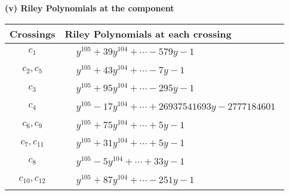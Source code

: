 \documentclass[1p]{elsarticle_modified}
\theoremstyle{definition}
\begin{document}
\newpage\renewcommand{\arraystretch}{1}
\flushleft \textbf{(v) Riley Polynomials at the component}\newline \\
\begin{tabular}{m{50pt}|m{274pt}}
Crossings & \hspace{64pt}Riley Polynomials at each crossing \\
\hline $$\begin{aligned}c_{1}\end{aligned}$$&$\begin{aligned}
&y^{105}+39 y^{104}+\cdots-579 y-1
\end{aligned}$\\
\hline $$\begin{aligned}c_{2},c_{5}\end{aligned}$$&$\begin{aligned}
&y^{105}+43 y^{104}+\cdots-7 y-1
\end{aligned}$\\
\hline $$\begin{aligned}c_{3}\end{aligned}$$&$\begin{aligned}
&y^{105}+95 y^{104}+\cdots-295 y-1
\end{aligned}$\\
\hline $$\begin{aligned}c_{4}\end{aligned}$$&$\begin{aligned}
&y^{105}-17 y^{104}+\cdots+26937541693 y-2777184601
\end{aligned}$\\
\hline $$\begin{aligned}c_{6},c_{9}\end{aligned}$$&$\begin{aligned}
&y^{105}+75 y^{104}+\cdots+5 y-1
\end{aligned}$\\
\hline $$\begin{aligned}c_{7},c_{11}\end{aligned}$$&$\begin{aligned}
&y^{105}+31 y^{104}+\cdots+5 y-1
\end{aligned}$\\
\hline $$\begin{aligned}c_{8}\end{aligned}$$&$\begin{aligned}
&y^{105}-5 y^{104}+\cdots+33 y-1
\end{aligned}$\\
\hline $$\begin{aligned}c_{10},c_{12}\end{aligned}$$&$\begin{aligned}
&y^{105}+87 y^{104}+\cdots-251 y-1
\end{aligned}$\\
\hline
\end{tabular}\\~\\
\end{document}
